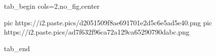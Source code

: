  
 
 
 
 


\ifcmt
  tab_begin cols=2,no_fig,center

     pic https://i2.paste.pics/d2051509f8ae691701e2d5c6e5ad5e40.png
		 pic https://i2.paste.pics/ad7f632f96ca72a129ca65290790dabc.png

  tab_end
\fi

